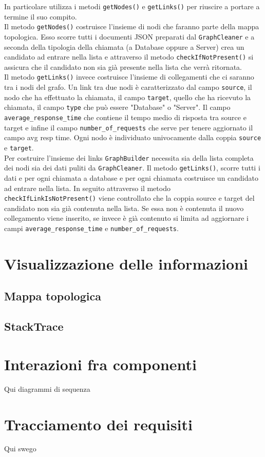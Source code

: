 	In particolare utilizza i metodi \texttt{getNodes()} e \texttt{getLinks()} per riuscire a portare a termine il suo compito.\\
	Il metodo \texttt{getNodes()} costruisce l'insieme di nodi che faranno parte della mappa topologica. Esso scorre tutti i documenti JSON preparati dal \texttt{GraphCleaner} e a seconda della tipologia della chiamata (a Database oppure a Server) crea un candidato ad entrare nella lista e attraverso il metodo \texttt{checkIfNotPresent()} si assicura che il candidato non sia già presente nella lista che verrà ritornata.\\
	Il metodo \texttt{getLinks()} invece costruisce l'insieme di collegamenti che ci saranno tra i nodi del grafo. Un link tra due nodi è caratterizzato dal campo \texttt{source}, il nodo che ha effettuato la chiamata, il campo \texttt{target}, quello che ha ricevuto la chiamata, il campo \texttt{type} che può essere "Database" o "Server". Il campo \texttt{average\_response\_time} che contiene il tempo medio di risposta tra source e target e infine il campo \texttt{number\_of\_requests} che serve per tenere aggiornato il campo avg resp time. Ogni nodo è individuato univocamente dalla coppia \texttt{source} e \texttt{target}.\\	
	Per costruire l'insieme dei links \texttt{GraphBuilder} necessita sia della lista completa dei nodi sia dei dati puliti da \texttt{GraphCleaner}. Il metodo \texttt{getLinks()}, scorre tutti i dati e per ogni chiamata a database e per ogni chiamata costruisce un candidato ad entrare nella lista. In seguito attraverso il metodo \texttt{checkIfLinkIsNotPresent()} viene controllato che la coppia source e target del candidato non sia già contenuta nella lista. Se essa non è contenuta il nuovo collegamento viene inserito, se invece è già contenuto si limita ad aggiornare i campi \texttt{average\_response\_time} e \texttt{number\_of\_requests}. 

\section{Visualizzazione delle informazioni}

\subsection{Mappa topologica}

\subsection{StackTrace}


\section{Interazioni fra componenti}
\label{sec:Interazioni}
Qui diagrammi di sequenza

\section{Tracciamento dei requisiti}
\label{sec:Tracciamento}
Qui swego 
